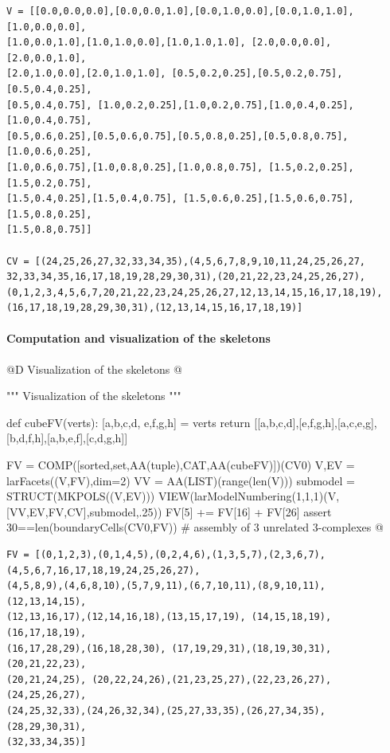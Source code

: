 \documentclass[11pt,oneside]{article}    %
\begin{document}
\begin{verbatim}
V = [[0.0,0.0,0.0],[0.0,0.0,1.0],[0.0,1.0,0.0],[0.0,1.0,1.0], [1.0,0.0,0.0],
[1.0,0.0,1.0],[1.0,1.0,0.0],[1.0,1.0,1.0], [2.0,0.0,0.0],[2.0,0.0,1.0],
[2.0,1.0,0.0],[2.0,1.0,1.0], [0.5,0.2,0.25],[0.5,0.2,0.75],[0.5,0.4,0.25],
[0.5,0.4,0.75], [1.0,0.2,0.25],[1.0,0.2,0.75],[1.0,0.4,0.25],[1.0,0.4,0.75], 
[0.5,0.6,0.25],[0.5,0.6,0.75],[0.5,0.8,0.25],[0.5,0.8,0.75], [1.0,0.6,0.25],
[1.0,0.6,0.75],[1.0,0.8,0.25],[1.0,0.8,0.75], [1.5,0.2,0.25],[1.5,0.2,0.75],
[1.5,0.4,0.25],[1.5,0.4,0.75], [1.5,0.6,0.25],[1.5,0.6,0.75],[1.5,0.8,0.25],
[1.5,0.8,0.75]]

CV = [(24,25,26,27,32,33,34,35),(4,5,6,7,8,9,10,11,24,25,26,27,
32,33,34,35,16,17,18,19,28,29,30,31),(20,21,22,23,24,25,26,27),
(0,1,2,3,4,5,6,7,20,21,22,23,24,25,26,27,12,13,14,15,16,17,18,19),
(16,17,18,19,28,29,30,31),(12,13,14,15,16,17,18,19)]
\end{verbatim}


\paragraph{Computation and visualization of the skeletons}
@D Visualization of the skeletons
@{""" Visualization of the skeletons """

def cubeFV(verts): 
    [a,b,c,d,  e,f,g,h] = verts
    return [[a,b,c,d],[e,f,g,h],[a,c,e,g],[b,d,f,h],[a,b,e,f],[c,d,g,h]]

FV = COMP([sorted,set,AA(tuple),CAT,AA(cubeFV)])(CV0)
V,EV = larFacets((V,FV),dim=2)
VV = AA(LIST)(range(len(V)))
submodel = STRUCT(MKPOLS((V,EV)))
VIEW(larModelNumbering(1,1,1)(V,[VV,EV,FV,CV],submodel,.25)) 
FV[5] += FV[16] + FV[26]
assert 30==len(boundaryCells(CV0,FV))  # assembly of 3 unrelated 3-complexes
@}

\begin{verbatim}
FV = [(0,1,2,3),(0,1,4,5),(0,2,4,6),(1,3,5,7),(2,3,6,7), 
(4,5,6,7,16,17,18,19,24,25,26,27), 
(4,5,8,9),(4,6,8,10),(5,7,9,11),(6,7,10,11),(8,9,10,11), (12,13,14,15),
(12,13,16,17),(12,14,16,18),(13,15,17,19), (14,15,18,19),(16,17,18,19),
(16,17,28,29),(16,18,28,30), (17,19,29,31),(18,19,30,31),(20,21,22,23),
(20,21,24,25), (20,22,24,26),(21,23,25,27),(22,23,26,27),(24,25,26,27), 
(24,25,32,33),(24,26,32,34),(25,27,33,35),(26,27,34,35), (28,29,30,31),
(32,33,34,35)]
\end{verbatim}
\end{document}
